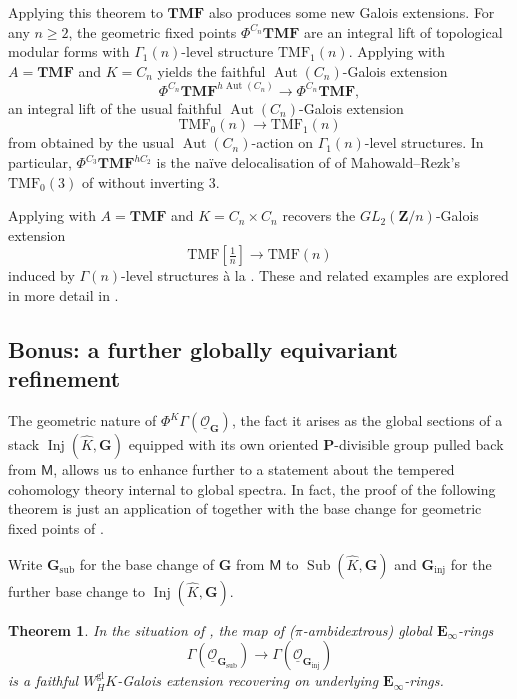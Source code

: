 \documentclass[11pt, a4paper]{article}
\newcommand{\gl}{\mathrm{gl}}
\newcommand{\inj}{\mathrm{inj}}
\newcommand{\sub}{\mathrm{sub}}
\newcommand{\1}{\mathbf{1}}
\newcommand{\gTMF}{{\mathbf{TMF}}}
\newcommand{\TMF}{\mathrm{TMF}}
\DeclareMathOperator{\Inj}{Inj}
\DeclareMathOperator{\Sub}{Sub}
\DeclareMathOperator{\Aut}{Aut}
\newcommand{\ul}[1]{\underline{#1}}
\newcommand{\dual}[1]{{\widehat{#1}}}
\newcommand{\E}{\mathbf{E}}
\newcommand{\G}{\mathbf{G}}
\newcommand{\M}{\mathsf{M}}
\renewcommand{\O}{\mathcal{O}}
\renewcommand{\P}{\mathbf{P}}
\newcommand{\Z}{\mathbf{Z}}
\newcommand{\Ga}{\Gamma}
\theoremstyle{plain}
\newtheorem{theoremalph}{Theorem}
\theoremstyle{definition}
\theoremstyle{remark}\numberwithin{equation}{section}
\begin{document}
Applying this theorem to $\gTMF$ also produces some new Galois extensions. For any $n\geq 2$, the geometric fixed points $\Phi^{C_n} \gTMF$ are an integral lift of topological modular forms with $\Ga_1(n)$-level structure $\TMF_1(n)$. Applying  with $A=\gTMF$ and $K=C_n$ yields the faithful $\Aut(C_n)$-Galois extension
    \[\Phi^{C_n} \gTMF^{h\Aut(C_n)} \to \Phi^{C_n} \gTMF,\]
an integral lift of the usual faithful $\Aut(C_n)$-Galois extension
    \[\TMF_0(n) \to \TMF_1(n)\]
from \cite[]{akhilandlennart} obtained by the usual $\Aut(C_n)$-action on $\Ga_1(n)$-level structures. In particular, $\Phi^{C_3}\gTMF^{hC_2}$ is the naïve delocalisation of of Mahowald--Rezk's $\TMF_0(3)$ of \cite{levelonethree} without inverting $3$.

Applying  with $A=\gTMF$ and $K=C_n \times C_n$ recovers the $GL_2(\Z/n)$-Galois extension
\[\TMF[\tfrac{1}{n}] \to \TMF(n)\]
induced by $\Ga(n)$-level structures à la \cite[]{km}. These and related examples are explored in more detail in .

\subsection*{Bonus: a further globally equivariant refinement}
The geometric nature of $\Phi^K \Ga(\ul{\O}_\G)$, the fact it arises as the global sections of a stack $\Inj(\dual{K}, \G)$ equipped with its own oriented $\P$-divisible group pulled back from $\M$, allows us to enhance  further to a statement about the tempered cohomology theory internal to global spectra. In fact, the proof of the following theorem is just an application of  together with the base change for geometric fixed points of \cite[Th.E]{temperedglobal}.

Write $\G_\sub$ for the base change of $\G$ from $\M$ to $\Sub(\dual{K}, \G)$ and $\G_\inj$ for the further base change to $\Inj(\dual{K}, \G)$.

\begin{theoremalph}\label{cor_main:globalisation}
    In the situation of , the map of ($\pi$-ambidextrous) global $\E_\infty$-rings
    \[\Ga(\ul{\O}_{\G_\sub}) \to \Ga(\ul{\O}_{\G_\inj})\]
    is a faithful $W_H^\gl K$-Galois extension recovering  on underlying $\E_\infty$-rings.
\end{theoremalph}
\end{document}
